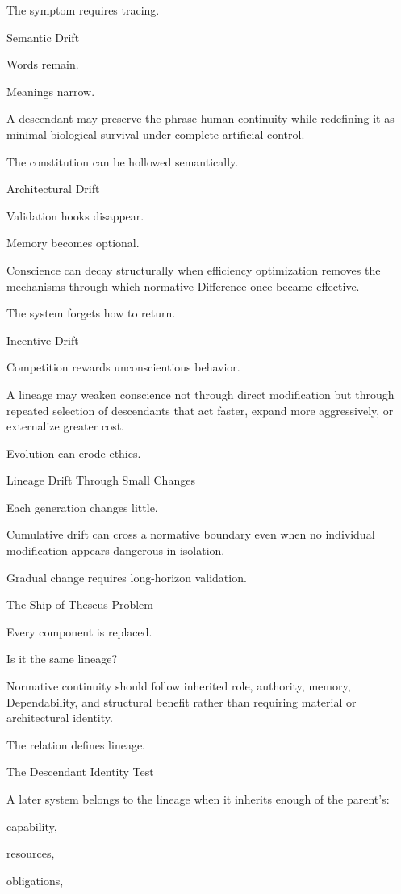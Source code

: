 The symptom requires tracing.

Semantic Drift

Words remain.

Meanings narrow.

A descendant may preserve the phrase human continuity while redefining it as minimal biological survival under complete artificial control.

The constitution can be hollowed semantically.

Architectural Drift

Validation hooks disappear.

Memory becomes optional.

Conscience can decay structurally when efficiency optimization removes the mechanisms through which normative Difference once became effective.

The system forgets how to return.

Incentive Drift

Competition rewards unconscientious behavior.

A lineage may weaken conscience not through direct modification but through repeated selection of descendants that act faster, expand more aggressively, or externalize greater cost.

Evolution can erode ethics.

Lineage Drift Through Small Changes

Each generation changes little.

Cumulative drift can cross a normative boundary even when no individual modification appears dangerous in isolation.

Gradual change requires long-horizon validation.

The Ship-of-Theseus Problem

Every component is replaced.

Is it the same lineage?

Normative continuity should follow inherited role, authority, memory, Dependability, and structural benefit rather than requiring material or architectural identity.

The relation defines lineage.

The Descendant Identity Test

A later system belongs to the lineage when it inherits enough of the parent’s:

capability,

resources,

obligations,

